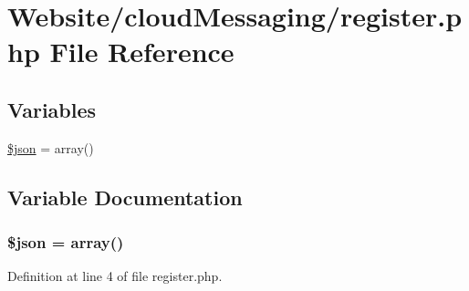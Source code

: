 \hypertarget{register_8php}{\section{Website/cloud\-Messaging/register.php File Reference}
\label{register_8php}
}
\subsection*{Variables}
\begin{DoxyCompactItemize}
\item 
\hyperlink{register_8php_acedd13b51401130848ce18f4d5c52605}{\$json} = array()
\end{DoxyCompactItemize}


\subsection{Variable Documentation}
\hypertarget{register_8php_acedd13b51401130848ce18f4d5c52605}{
\subsubsection[{\$json}]{\setlength{\rightskip}{0pt plus 5cm}\$json = array()}}\label{register_8php_acedd13b51401130848ce18f4d5c52605}


Definition at line 4 of file register.\-php.


